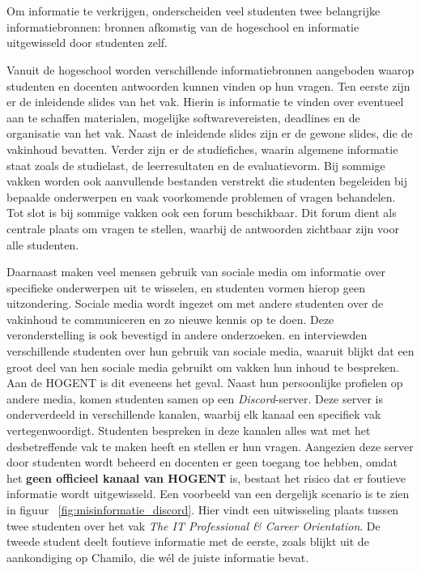 \chapter{}%
\label{ch:literatuurstudie}

\section{}%
\label{sec:state-of-the-art}

Om informatie te verkrijgen, onderscheiden veel studenten twee belangrijke informatiebronnen: bronnen afkomstig van de hogeschool en informatie uitgewisseld door studenten zelf.

Vanuit de hogeschool worden verschillende informatiebronnen aangeboden waarop studenten en docenten antwoorden kunnen vinden op hun vragen. Ten eerste zijn er de inleidende slides van het vak. Hierin is informatie te vinden over eventueel aan te schaffen materialen, mogelijke softwarevereisten, deadlines en de organisatie van het vak. Naast de inleidende slides zijn er de gewone slides, die de vakinhoud bevatten. Verder zijn er de studiefiches, waarin algemene informatie staat zoals de studielast, de leerresultaten en de evaluatievorm. Bij sommige vakken worden ook aanvullende bestanden verstrekt die studenten begeleiden bij bepaalde onderwerpen en vaak voorkomende problemen of vragen behandelen. Tot slot is bij sommige vakken ook een forum beschikbaar. Dit forum dient als centrale plaats om vragen te stellen, waarbij de antwoorden zichtbaar zijn voor alle studenten.

Daarnaast maken veel mensen gebruik van sociale media om informatie over specifieke onderwerpen uit te wisselen, en studenten vormen hierop geen uitzondering. Sociale media wordt ingezet om met andere studenten over de vakinhoud te communiceren en zo nieuwe kennis op te doen. Deze veronderstelling is ook bevestigd in andere onderzoeken. \textcite{M.Talaue2018} en \textcite{Bal2017} interviewden verschillende studenten over hun gebruik van sociale media, waaruit blijkt dat een groot deel van hen sociale media gebruikt om vakken hun inhoud te bespreken. Aan de HOGENT is dit eveneens het geval. Naast hun persoonlijke profielen op andere media, komen studenten samen op een \textit{Discord}-server. Deze server is onderverdeeld in verschillende kanalen, waarbij elk kanaal een specifiek vak vertegenwoordigt. Studenten bespreken in deze kanalen alles wat met het desbetreffende vak te maken heeft en stellen er hun vragen. Aangezien deze server door studenten wordt beheerd en docenten er geen toegang toe hebben, omdat het \textbf{geen officieel kanaal van HOGENT} is, bestaat het risico dat er foutieve informatie wordt uitgewisseld. Een voorbeeld van een dergelijk scenario is te zien in figuur ~\ref{fig:misinformatie_discord}. Hier vindt een uitwisseling plaats tussen twee studenten over het vak \textit{The IT Professional \& Career Orientation}. De tweede student deelt foutieve informatie met de eerste, zoals blijkt uit de aankondiging op Chamilo, die wél de juiste informatie bevat.

